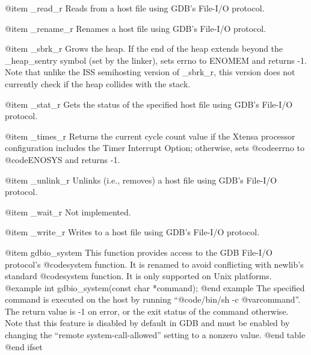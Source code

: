 @item _read_r
Reads from a host file using GDB's File-I/O protocol.

@item _rename_r
Renames a host file using GDB's File-I/O protocol.

@item _sbrk_r
Grows the heap. If the end of the heap extends beyond the _heap_sentry
symbol (set by the linker), sets errno to ENOMEM and returns -1.
Note that unlike the ISS semihosting version of _sbrk_r, this version
does not currently check if the heap collides with the stack.

@item _stat_r
Gets the status of the specified host file using GDB's File-I/O protocol.

@item _times_r
Returns the current cycle count value if the Xtensa processor
configuration includes the Timer Interrupt Option; otherwise, sets
@code{errno} to @code{ENOSYS} and returns -1.

@item _unlink_r
Unlinks (i.e., removes) a host file using GDB's File-I/O protocol.

@item _wait_r
Not implemented.

@item _write_r
Writes to a host file using GDB's File-I/O protocol.

@item gdbio_system
This function provides access to the GDB File-I/O protocol's @code{system}
function.  It is renamed to avoid conflicting with newlib's standard
@code{system} function.  It is only supported on Unix platforms.
@example
int gdbio_system(const char *command);
@end example
The specified command is executed on the host by running
``@code{/bin/sh -c @var{command}}''.  The return value is -1 on error, or
the exit status of the command otherwise.  Note that this feature is
disabled by default in GDB and must be enabled by changing the
``remote system-call-allowed'' setting to a nonzero value.
@end table
@end ifset
